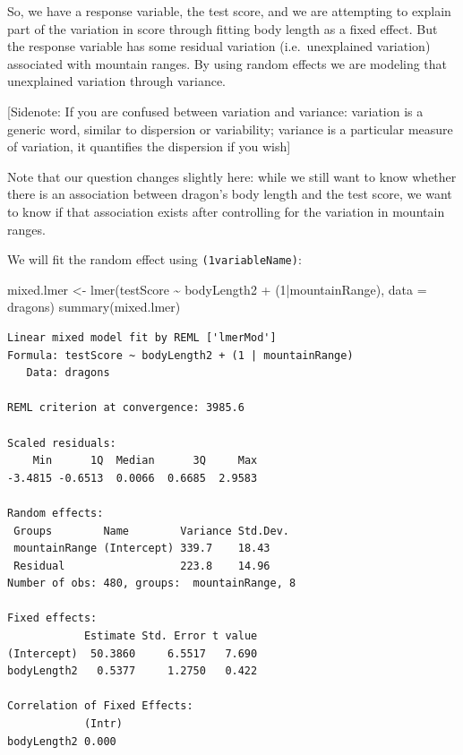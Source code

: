\documentclass[
  letterpaper,
  DIV=11,
  numbers=noendperiod]{scrreprt}
\newenvironment{Shaded}{\begin{snugshade}}{\end{snugshade}}
\newcommand{\AttributeTok}[1]{\textcolor[rgb]{0.40,0.45,0.13}{#1}}
\newcommand{\DecValTok}[1]{\textcolor[rgb]{0.68,0.00,0.00}{#1}}
\newcommand{\FunctionTok}[1]{\textcolor[rgb]{0.28,0.35,0.67}{#1}}
\newcommand{\NormalTok}[1]{\textcolor[rgb]{0.00,0.23,0.31}{#1}}
\newcommand{\OtherTok}[1]{\textcolor[rgb]{0.00,0.23,0.31}{#1}}
\newcommand{\SpecialCharTok}[1]{\textcolor[rgb]{0.37,0.37,0.37}{#1}}
\begin{document}
So, we have a response variable, the test score, and we are attempting
to explain part of the variation in score through fitting body length as
a fixed effect. But the response variable has some residual variation
(i.e.~unexplained variation) associated with mountain ranges. By using
random effects we are modeling that unexplained variation through
variance.

{[}Sidenote: If you are confused between variation and variance:
variation is a generic word, similar to dispersion or variability;
variance is a particular measure of variation, it quantifies the
dispersion if you wish{]}

Note that our question changes slightly here: while we still want to
know whether there is an association between dragon's body length and
the test score, we want to know if that association exists after
controlling for the variation in mountain ranges.

We will fit the random effect using \texttt{(1\textbar{}variableName)}:

\begin{Shaded}
\begin{Highlighting}[]
\NormalTok{mixed.lmer }\OtherTok{\textless{}{-}} \FunctionTok{lmer}\NormalTok{(testScore }\SpecialCharTok{\textasciitilde{}}\NormalTok{ bodyLength2 }\SpecialCharTok{+}\NormalTok{ (}\DecValTok{1}\SpecialCharTok{|}\NormalTok{mountainRange), }\AttributeTok{data =}\NormalTok{ dragons)}
\FunctionTok{summary}\NormalTok{(mixed.lmer)}
\end{Highlighting}
\end{Shaded}

\begin{verbatim}
Linear mixed model fit by REML ['lmerMod']
Formula: testScore ~ bodyLength2 + (1 | mountainRange)
   Data: dragons

REML criterion at convergence: 3985.6

Scaled residuals: 
    Min      1Q  Median      3Q     Max 
-3.4815 -0.6513  0.0066  0.6685  2.9583 

Random effects:
 Groups        Name        Variance Std.Dev.
 mountainRange (Intercept) 339.7    18.43   
 Residual                  223.8    14.96   
Number of obs: 480, groups:  mountainRange, 8

Fixed effects:
            Estimate Std. Error t value
(Intercept)  50.3860     6.5517   7.690
bodyLength2   0.5377     1.2750   0.422

Correlation of Fixed Effects:
            (Intr)
bodyLength2 0.000 
\end{verbatim}
\end{document}
